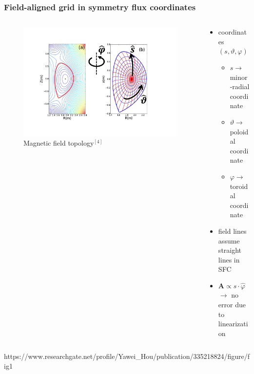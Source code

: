 \documentclass{beamer}
\begin{document}
\begin{frame}
\frametitle{Field-aligned grid in symmetry flux coordinates}
\vspace{-1.2 cm}
\begin{columns}[onlytextwidth]
	\begin{column}{0.5\textwidth}
		\begin{center}
			\begin{figure}
				\hspace{0.1cm}\includegraphics[trim={2cm 3cm 5cm 2cm},clip,width=1\textwidth]{FIGURES/SFC_pdf1.pdf}
				Magnetic field topology$^{[4]}$
			\end{figure}
		\end{center}
	\end{column}
	\begin{column}{0.5\textwidth}
		\vspace{0 cm}
		\begin{center}
			\begin{itemize}
				\item coordinates $(s,\vartheta,\varphi)$\\
							\begin{itemize}
					\item $s\rightarrow$ minor-radial coordinate
					\item $\vartheta \rightarrow$ poloidal coordinate
					\item $\varphi \rightarrow$ toroidal coordinate
				\end{itemize}
				\item field lines assume straight lines in SFC
				\item $\textbf{A}\propto s\cdot\hat{\varphi}$
				$\rightarrow$ no error due to linearization
			\end{itemize}
		\end{center}
	\end{column}
\end{columns}
\vspace{1.1cm}
\begin{tiny}
[4] https://www.researchgate.net/profile/Yawei\_Hou/publication/335218824/figure/fig1
\end{tiny}
\end{frame}
\end{document}
